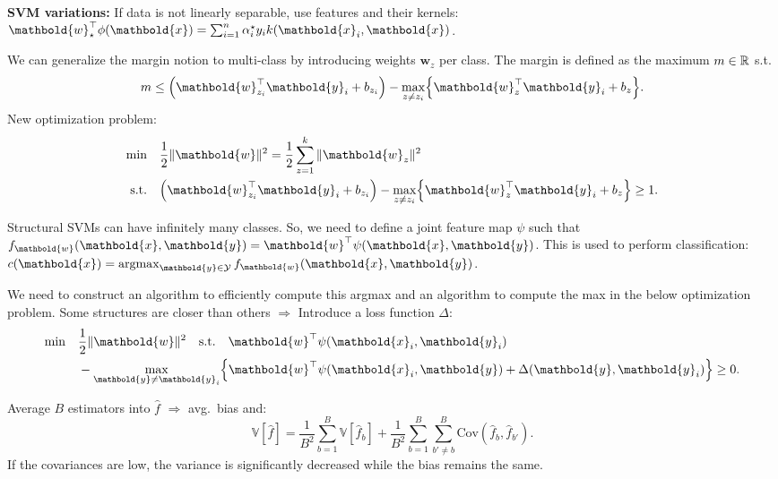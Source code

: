 \documentclass[9pt]{extarticle}
\newenvironment{topic}[1]
{\textbf{\sffamily \colorbox{black}{\rlap{\textbf{\textcolor{white}{#1}}}\hspace{\linewidth}\hspace{-2\fboxsep}}}}
{}
\newenvironment{subtopic}[1]
{\textbf{\sffamily #1:}}
{}
\renewcommand{\vec}[1]{\ensuremath{\mathbold{#1}}}
\renewcommand{\Var}{\mathbb{V}}
\begin{document}
\begin{multicols*}{3}
\begin{topic}{Convex optimization and SVMs}
\begin{subtopic}{SVM variations}
            If data is not linearly separable, use features and their kernels: $\transpose{\vec{w}_{\star}}
                \phi(\vec{x}) = \sum_{i=1}^{n} \alpha_i^\star y_i k(\vec{x}_i, \vec{x})$.

            We can generalize the margin notion to multi-class by introducing weights $\vec{w}_z$ per class.
            The margin is defined as the maximum $m \in \mathbb{R}$ s.t.\ \[
                m \leq \lft( \transpose{\vec{w}_{z_i}} \vec{y}_i + b_{z_i} \rgt) - \max_{z \neq z_i} \lft\{ \transpose{\vec{w}_z} \vec{y}_i + b_z \rgt\}.
            \]
            New optimization problem:
            \begin{align*}
                \text{min}  & \quad \frac{1}{2} \| \vec{w} \|^2 = \frac{1}{2} \sum_{z=1}^{k} \| \vec{w}_z \|^2                                                                \\
                \text{s.t.} & \quad \lft( \transpose{\vec{w}_{z_i}} \vec{y}_i + b_{z_i} \rgt) - \max_{z \neq z_i} \lft\{ \transpose{\vec{w}_z} \vec{y}_i + b_z \rgt\} \geq 1.
            \end{align*}

            Structural SVMs can have infinitely many classes. So, we need to define a joint feature map $\psi$
            such that $f_{\vec{w}}(\vec{x}, \vec{y}) = \transpose{\vec{w}} \psi(\vec{x}, \vec{y})$. This is
            used to perform classification: $c(\vec{x}) = \argmax_{\vec{y} \in \mathcal{Y}}
                f_{\vec{w}}(\vec{x}, \vec{y})$.

            We need to construct an algorithm to efficiently compute this argmax and an algorithm to compute
            the max in the below optimization problem. Some structures are closer than others $\Rightarrow$
            Introduce a loss function $\Delta$:
            \begin{align*}
                \text{min} & \quad \frac{1}{2} \| \vec{w} \|^2 \quad \text{s.t.} \quad \transpose{\vec{w}} \psi(\vec{x}_i, \vec{y}_i)                               \\
                           & \quad  - \max_{\vec{y} \neq \vec{y}_i} \lft\{ \transpose{\vec{w}} \psi(\vec{x}_i, \vec{y}) + \Delta(\vec{y}, \vec{y}_i) \rgt\} \geq 0.
            \end{align*}
        \end{subtopic}

    \end{topic}

    \begin{topic}{Ensembles}
        Average $B$ estimators into $\hat{f}$ $\Rightarrow$ avg.\ bias and: \[
            \Var[\hat{f}] = \frac{1}{B^2} \sum_{b=1}^{B} \Var[\hat{f}_b] + \frac{1}{B^2} \sum_{b=1}^{B} \sum_{b' \neq b}^{B} \mathrm{Cov}(\hat{f}_b, \hat{f}_{b'}).
        \]
        If the covariances are low, the variance is significantly decreased while the bias remains the
        same.


\end{topic}
\end{multicols*}
\end{document}
